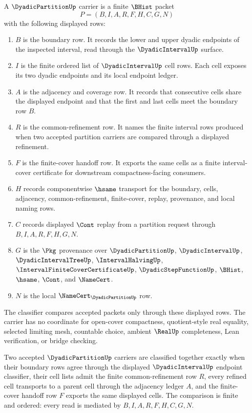 \begin{definition}
\label{def:dyadic-partition-carrier-rows}
A $\DyadicPartitionUp$ carrier is a finite $\BHist$ packet
$$
P=(B,I,A,R,F,H,C,G,N)
$$
with the following displayed rows:
\begin{enumerate}
\item $B$ is the boundary row. It records the lower and upper dyadic endpoints of the inspected interval, read through the $\DyadicIntervalUp$ surface.
\item $I$ is the finite ordered list of $\DyadicIntervalUp$ cell rows. Each cell exposes its two dyadic endpoints and its local endpoint ledger.
\item $A$ is the adjacency and coverage row. It records that consecutive cells share the displayed endpoint and that the first and last cells meet the boundary row $B$.
\item $R$ is the common-refinement row. It names the finite interval rows produced when two accepted partition carriers are compared through a displayed refinement.
\item $F$ is the finite-cover handoff row. It exports the same cells as a finite interval-cover certificate for downstream compactness-facing consumers.
\item $H$ records componentwise $\hsame$ transport for the boundary, cells, adjacency, common-refinement, finite-cover, replay, provenance, and local naming rows.
\item $C$ records displayed $\Cont$ replay from a partition request through $B,I,A,R,F,H,G,N$.
\item $G$ is the $\Pkg$ provenance over $\DyadicPartitionUp$, $\DyadicIntervalUp$, $\DyadicIntervalTreeUp$, $\IntervalHalvingUp$, $\IntervalFiniteCoverCertificateUp$, $\DyadicStepFunctionUp$, $\BHist$, $\hsame$, $\Cont$, and $\NameCert$.
\item $N$ is the local $\NameCert_{\DyadicPartitionUp}$ row.
\end{enumerate}
The classifier compares accepted packets only through these displayed rows. The carrier has no coordinate for open-cover compactness, quotient-style real equality, selected limiting mesh, countable choice, ambient $\RealUp$ completeness, Lean verification, or bridge checking.
\end{definition}

\begin{definition}
\label{def:dyadic-partition-classifier-rows}
Two accepted $\DyadicPartitionUp$ carriers are classified together exactly when their boundary rows agree through the displayed $\DyadicIntervalUp$ endpoint classifier, their cell lists admit the finite common-refinement row $R$, every refined cell transports to a parent cell through the adjacency ledger $A$, and the finite-cover handoff row $F$ exports the same displayed cells. The comparison is finite and ordered: every read is mediated by $B,I,A,R,F,H,C,G,N$.
\end{definition}

